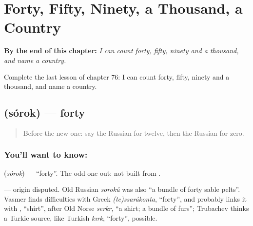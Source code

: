 
\chapter{Forty, Fifty, Ninety, a Thousand, a Country}
\label{ch:ru-forty-fifty-ninety-a-thousand-a-country}

\begin{chapteropening}
\textbf{By the end of this chapter:} \emph{I can count forty, fifty, ninety and a thousand, and name a country.}

Complete the last lesson of chapter 76: I can count forty, fifty, ninety and a thousand, and name a country.
\end{chapteropening}

\section[\texorpdfstring{\ru{сорок} (sórok)}{сорок (sórok)}]{ (sórok) — forty}

\label{lesson:RU-C76-forty}



\begin{quote}
Before the new one: say the Russian for twelve, then the Russian for zero.
\end{quote}

\subsection*{You'll want to know: }
\textbf{} (\emph{sórok}) — \textquotedblleft{}forty\textquotedblright{}. The odd one out: not built from \textbf{}.

\begin{cousinweb}
\textbf{} — origin disputed. Old Russian \emph{sorokŭ} was also \textquotedblleft{}a bundle of forty sable pelts\textquotedblright{}. Vasmer finds difficulties with Greek \emph{(te)ssarákonta}, \textquotedblleft{}forty\textquotedblright{}, and probably links it with \emph{}, \textquotedblleft{}shirt\textquotedblright{}, after Old Norse \emph{serkr}, \textquotedblleft{}a shirt; a bundle of furs\textquotedblright{}; Trubachev thinks a Turkic source, like Turkish \emph{kırk}, \textquotedblleft{}forty\textquotedblright{}, possible.
\end{cousinweb}

